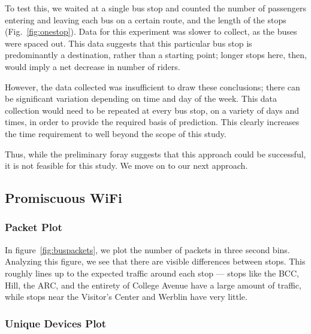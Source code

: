 To test this, we waited at a single bus stop and counted the number of passengers entering and leaving each bus on a certain route, and the length of the stops (Fig.~\ref{fig:onestop}).
Data for this experiment was slower to collect, as the buses were spaced out.
This data suggests that this particular bus stop is predominantly a destination, rather than a starting point; longer stops here, then, would imply a net decrease in number of riders.
    
However, the data collected was insufficient to draw these conclusions; there can be significant variation depending on time and day of the week.
This data collection would need to be repeated at every bus stop, on a variety of days and times, in order to provide the required basis of prediction.
This clearly increases the time requirement to well beyond the scope of this study.
	
Thus, while the preliminary foray suggests that this approach could be successful, it is not feasible for this study.
We move on to our next approach.

\subsection{Promiscuous WiFi}
    
\subsubsection*{Packet Plot}

In figure~\ref{fig:buspackets}, we plot the number of packets in three second bins.
Analyzing this figure, we see that there are visible differences between stops.
This roughly lines up to the expected traffic around each stop --- stops like the BCC, Hill, the ARC, and the entirety of College Avenue have a large amount of traffic, while stops near the Visitor's Center and Werblin have very little.

\subsubsection*{Unique Devices Plot}

